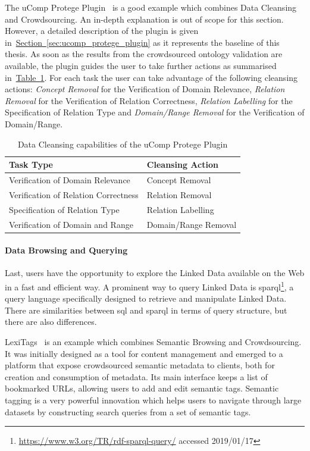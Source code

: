 The uComp Protege Plugin~\cite{wohlgenannt2016} is a good example which combines Data Cleansing and Crowdsourcing. An in-depth explanation is out of scope for this section. However, a detailed description of the plugin is given in~\hyperref[sec:ucomp_protege_plugin]{Section~\ref*{sec:ucomp_protege_plugin}} as it represents the baseline of this thesis.
As soon as the results from the crowdsourced ontology validation are available, the plugin guides the user to take further actions as summarised in~\hyperref[table:data_cleansing_ucomp_protege]{Table~\ref*{table:data_cleansing_ucomp_protege}}. For each task the user can take advantage of the following cleansing actions: \emph{Concept Removal} for the Verification of Domain Relevance, \emph{Relation Removal} for the Verification of Relation Correctness, \emph{Relation Labelling} for the Specification of Relation Type and \emph{Domain/Range Removal} for the Verification of Domain/Range. 
\begingroup
\renewcommand{\arraystretch}{2}
	\begin{table}
		\centering
		\begin{tabularx}{0.8\textwidth}{l l}
			\toprule
			Task Type & Cleansing Action \\
			\midrule
	        Verification of Domain Relevance & Concept Removal \\
			Verification of Relation Correctness & Relation Removal \\
			Specification of Relation Type & Relation Labelling \\
			Verification of Domain and Range & Domain/Range Removal \\
			\bottomrule
		\end{tabularx}
		\caption{Data Cleansing capabilities of the uComp Protege Plugin}
		\label{table:data_cleansing_ucomp_protege}
	\end{table}
\endgroup


\paragraph{Data Browsing and Querying}
Last, users have the opportunity to explore the Linked Data available on the Web in a fast and efficient way. A prominent way to query Linked Data is
\gls{sparql}\footnote{\url{https://www.w3.org/TR/rdf-sparql-query/} accessed 2019/01/17}, a query language specifically designed to retrieve and manipulate Linked Data. There are similarities between \gls{sql} and \gls{sparql} in terms of query structure, but there are also differences.

LexiTags~\cite{veres2013} is an example which combines Semantic Browsing and Crowdsourcing. It was initially designed as a tool for content management and emerged to a platform that expose crowdsourced semantic metadata to clients, both for creation and consumption of metadata. Its main interface keeps a list of bookmarked URLs, allowing users to add and edit semantic tags. Semantic tagging is a very powerful innovation which helps users to navigate through large datasets by constructing search queries from a set of semantic tags. 

